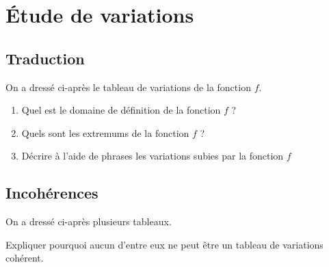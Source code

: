 \documentclass[oneside,12pt]{article}          %
\begin{document}
\section{Étude de variations}

\subsection{Traduction}
On a dressé ci-après le tableau de variations de la fonction $f$.

\begin{minipage}{0.54\linewidth}
	\begin{enumerate}
		\item Quel est le domaine de définition de la fonction $f$ ?
		\item Quels sont les extremums de la fonction $f$ ?
		\item Décrire à l'aide de phrases les variations subies par la fonction $f$
	\end{enumerate}
\end{minipage} \hspace{1mm}
\begin{minipage}{0.4\linewidth}
\end{minipage}



\subsection{Incohérences}
On a dressé ci-après plusieurs tableaux.

Expliquer pourquoi aucun d'entre eux ne peut être un tableau de variations cohérent.
\end{document}
